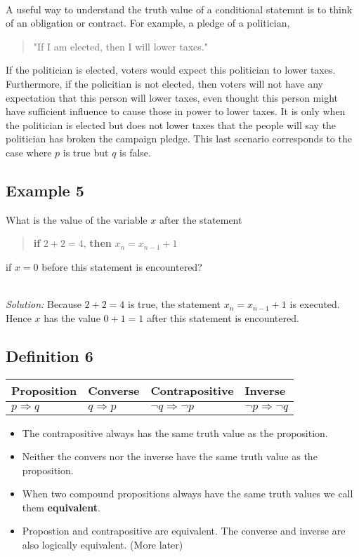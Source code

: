 \documentclass{article}
\begin{document}
\noindent \\ A useful way to understand the truth value of a conditional statemnt is to think of an
obligation or contract. For example, a pledge of a politician,
\begin{quote}
	"If I am elected, then I will lower taxes."
\end{quote}
If the politician is elected, voters would expect this politician to lower taxes. Furthermore, if the policitian
is not elected, then voters will not have any expectation that this person will lower taxes, even thought this person
might have sufficient influence to cause those in power to lower taxes. It is only when the politician is elected
but does not lower taxes that the people will say the politician has broken the campaign pledge. This last scenario
corresponds to the case where $p$ is true but $q$ is false.
\subsection*{Example 5}
What is the value of the variable $x$ after the statement
\begin{quote}
	\textbf{if} $2+2=4$, \textbf{then} $x_{n} \equal x_{n-1}+1$
\end{quote}
if $x = 0$ before this statement is encountered?

\noindent \\ \textit{Solution:} Because $2+2 = 4$ is true, the statement $x_n = x_{n-1}+1$ is executed.
Hence $x$ has the value $0+1 = 1$ after this statement is encountered.

\subsection[Converse, contrapositive, inverse]{Definition 6}
\begin{center}
	\begin{tabular}{|l|l|l|l|}
		\hline
		Proposition       & Converse          & Contrapositive                & Inverse                       \\
		\hline
		$p \Rightarrow q$ & $q \Rightarrow p$ & $\neg{q} \Rightarrow \neg{p}$ & $\neg{p} \Rightarrow \neg{q}$ \\
		\hline
	\end{tabular}
\end{center}
\begin{itemize}
	\item The contrapositive always has the same truth value as the proposition.
	\item Neither the convers nor the inverse have the same truth value as the proposition.
	\item When two compound propositions always have the same truth values we call them \textbf{equivalent}.
	\item Propostion and contrapositive are equivalent. The converse and inverse are also logically equivalent. (More later)
\end{itemize}
\end{document}
